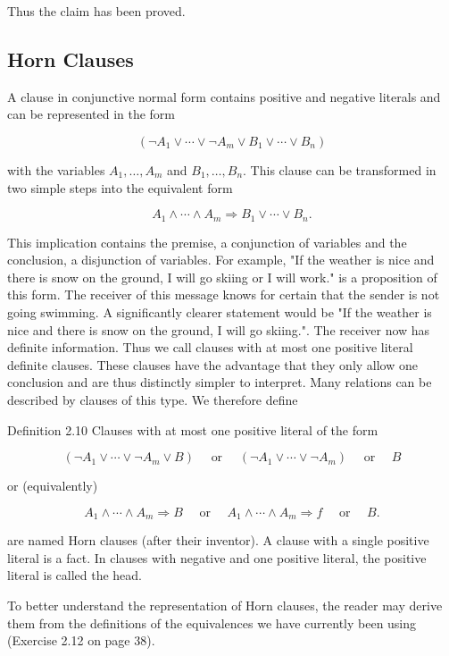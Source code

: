 \documentclass[10pt]{book}
\begin{document}
Thus the claim has been proved.

\subsection*{Horn Clauses}
A clause in conjunctive normal form contains positive and negative literals and can be represented in the form

$$
\left(\neg A_{1} \vee \cdots \vee \neg A_{m} \vee B_{1} \vee \cdots \vee B_{n}\right)
$$

with the variables $A_{1}, \ldots, A_{m}$ and $B_{1}, \ldots, B_{n}$. This clause can be transformed in two simple steps into the equivalent form

$$
A_{1} \wedge \cdots \wedge A_{m} \Rightarrow B_{1} \vee \cdots \vee B_{n} .
$$

This implication contains the premise, a conjunction of variables and the conclusion, a disjunction of variables. For example, "If the weather is nice and there is snow on the ground, I will go skiing or I will work." is a proposition of this form. The receiver of this message knows for certain that the sender is not going swimming. A significantly clearer statement would be "If the weather is nice and there is snow on the ground, I will go skiing.". The receiver now has definite information. Thus we call clauses with at most one positive literal definite clauses. These clauses have the advantage that they only allow one conclusion and are thus distinctly simpler to interpret. Many relations can be described by clauses of this type. We therefore define

Definition 2.10 Clauses with at most one positive literal of the form

$$
\left(\neg A_{1} \vee \cdots \vee \neg A_{m} \vee B\right) \quad \text { or } \quad\left(\neg A_{1} \vee \cdots \vee \neg A_{m}\right) \quad \text { or } \quad B
$$

or (equivalently)

$$
A_{1} \wedge \cdots \wedge A_{m} \Rightarrow B \quad \text { or } \quad A_{1} \wedge \cdots \wedge A_{m} \Rightarrow f \quad \text { or } \quad B .
$$

are named Horn clauses (after their inventor). A clause with a single positive literal is a fact. In clauses with negative and one positive literal, the positive literal is called the head.

To better understand the representation of Horn clauses, the reader may derive them from the definitions of the equivalences we have currently been using (Exercise 2.12 on page 38).
\end{document}
